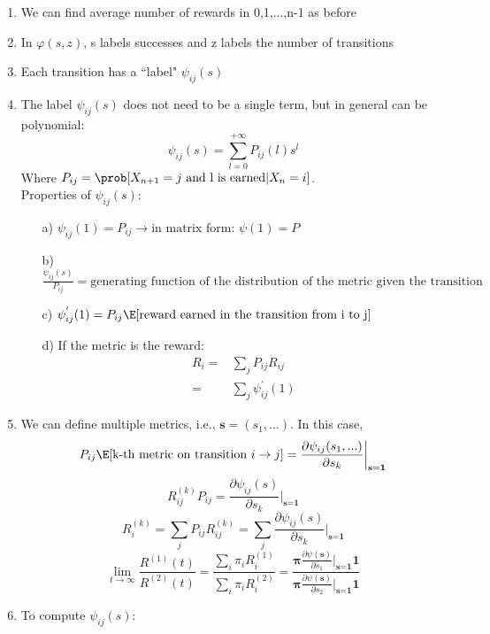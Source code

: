 \begin{enumerate}
	\item We can find average number of rewards in 0,1,...,n-1 as before
	\item In $\varphi(s,z)$, s labels successes and z labels the number of transitions
	\item Each transition has a ``label" $\psi_{ij}(s)$
	\item The label $\psi_{ij}(s)$ does not need to be a single term, but in general can be polynomial: $$\psi_{ij}(s) = \sum\limits_{l=0}^{+\infty} P_{ij}(l)s^l$$
				Where $P_{ij} = \prob[X_{n+1}=j\text{ and l is earned}| X_n = i]$.\\
				Properties of $\psi_{ij}(s)$:
				\begin{itemize}
					\item[a)] $\psi_{ij}(1)=P_{ij} \rightarrow \text{in matrix form: } \psi(1) = P$
					\item[b)] $\frac{\psi_{ij}(s)}{P_{ij}}=\text{generating function of the distribution of the metric given the transition}$
					\item[c)] $\psi_{ij}^{'}(1)=P_{ij}\E[\text{reward earned in the transition from i to j}] $
					\item[d)] If the metric is the reward:
								\begin{equation}
									\begin{split}
										R_i =& \sum_j P_{ij}R_{ij} \\
										    =& \sum_j \psi_{ij}^{'}(1)
									\end{split}
								\end{equation}
				\end{itemize}
	\item We can define multiple metrics, i.e., $\textbf{s} = (s_1,...)$. In this case,
				$$P_{ij}\E[\text{k-th metric on transition } i \rightarrow j] = \frac{\partial \psi_{ij}(s_1,...)}{\partial s_k}\bigg|_{\textbf{s}=\textbf{1}} $$
				$$R_{ij}^{(k)}P_{ij}=  \frac{\partial \psi_{ij}(s)}{\partial s_k}\bigg|_{\textbf{s}=\textbf{1}}$$
				$$R_i^{(k)} = \sum_j P_{ij}R_{ij}^{(k)} = \sum_j \frac{\partial \psi_{ij}(s)}{\partial s_k}\bigg|_{\textbf{s}=\textbf{1}}$$
				$$ \lim_{t \to \infty}\frac{R^{(1)}(t)}{R^{(2)}(t)}=\frac{\sum_i \pi_i R_i^{(1)}}{\sum_i \pi_i R_i^{(2)}}= \frac{\mathbf{\pi} \frac{\partial \psi(\mathbf{s})}{\partial s_1}\bigg|_{\textbf{s}=\textbf{1}}\textbf{1}}{\mathbf{\pi}\frac{\partial \psi(\mathbf{s})}{\partial s_2}\bigg|_{\textbf{s}=\textbf{1}}\textbf{1}}$$
	\item To compute $\psi_{ij}(s)$:

\end{enumerate}
